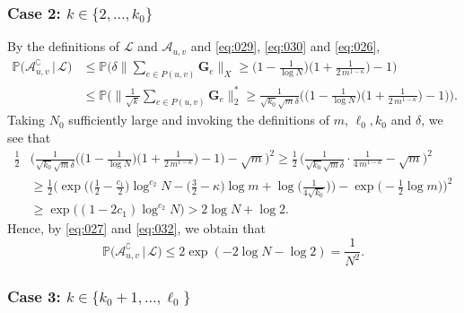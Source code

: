 \documentclass[11pt,leqno]{amsart}
\theoremstyle{remark}
\theoremstyle{plain}
\begin{document}
\subsubsection*{Case 2: $k\in\{2,\dots,k_0\}$}

By the definitions of $\mathcal{L}$ and $\mathcal{A}_{u,v}$ and \eqref{eq:029}, \eqref{eq:030} and \eqref{eq:026},
\begin{align} \label{eq:032}
\mathbb{P}\big(\mathcal{A}_{u,v}^{\complement}\,\big|\,\mathcal{L}\big) &
\leqslant \mathbb{P}\Bigg( \delta\Big\|\sum_{e\in P(u, v)} \mathbf{G}_e\Big\|_X\geqslant
\Big(1-\frac{1}{\log N}\Big) \Big(1+\frac{1}{2\, m^{1-\kappa}}\Big)-1\Bigg) \\
& \leqslant \mathbb{P}\Bigg(\Big\|\frac{1}{\sqrt{k}}\sum_{e\in P(u, v)} \mathbf{G}_e\Big\|_2^*\geqslant
\frac{1}{\sqrt{k_0}\sqrt{m}\delta} \Big( \Big(1-\frac{1}{\log N}\Big) \Big(1+\frac{1}{2\, m^{1-\kappa}}\Big)-1\Big)\Bigg). \nonumber
\end{align}
Taking $N_0$ sufficiently large and invoking the definitions of $m$, $\ell_0,k_0$ and $\delta$, we see that
\begin{align*}
\frac12 & \Big(  \frac{1}{\sqrt{k_0}\sqrt{m}\delta} \Big( \Big(1-\frac{1}{\log N}\Big)
\Big(1+\frac{1}{2\, m^{1-\kappa}}\Big)-1\Big) - \sqrt{m}\Big)^2 \geqslant \frac12 \,
\Big(\frac{1}{\sqrt{k_0}\sqrt{m}\delta}\cdot\frac{1}{4\, m^{1-\kappa}}-\sqrt{m}\Big)^2 \\
& \geqslant \frac12 \Big( \exp\Big( \Big(\frac12-\frac{c_1}{2}\Big) \log^{c_2}N- \Big(\frac32-\kappa\Big) \log m +
\log\Big(\frac{1}{4\sqrt{k_0}}\Big)\Big)- \exp\Big(-\frac12\log m\Big) \Big)^2 \\
&\geqslant \exp\big( (1-2c_1) \log^{c_2}N\big) >2\log N+\log2.
\end{align*}
Hence, by \eqref{eq:027} and \eqref{eq:032}, we obtain that
\[ \mathbb{P}\big( \mathcal{A}_{u,v}^{\complement}\,\big|\,\mathcal{L}\big)
\leqslant 2\exp(-2\log N-\log2) = \frac{1}{N^2}. \]

\subsubsection*{Case 3: $k\in\{k_0+1,\dots, \ell_0\}$}
\end{document}
